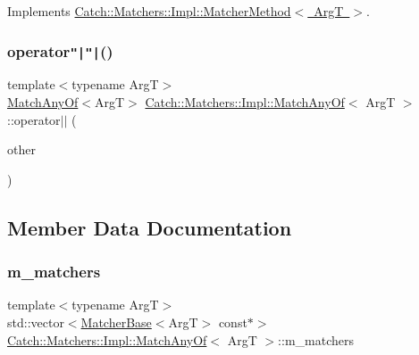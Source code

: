 Implements \mbox{\hyperlink{struct_catch_1_1_matchers_1_1_impl_1_1_matcher_method_ae0920ff9e817acf08e1bb0cbcb044e30}{Catch\+::\+Matchers\+::\+Impl\+::\+Matcher\+Method$<$ Arg\+T $>$}}.

\mbox{\label{struct_catch_1_1_matchers_1_1_impl_1_1_match_any_of_ab356d77b28b487c2d9fe8b1e1e6f78c9}} 
\subsubsection{\texorpdfstring{operator\texttt{"|}\texttt{"|}()}{operator||()}}
{\footnotesize\ttfamily template$<$typename ArgT$>$ \\
\mbox{\hyperlink{struct_catch_1_1_matchers_1_1_impl_1_1_match_any_of}{Match\+Any\+Of}}$<$ArgT$>$ \mbox{\hyperlink{struct_catch_1_1_matchers_1_1_impl_1_1_match_any_of}{Catch\+::\+Matchers\+::\+Impl\+::\+Match\+Any\+Of}}$<$ ArgT $>$\+::operator$\vert$$\vert$ (\begin{DoxyParamCaption}\item[{\mbox{\hyperlink{struct_catch_1_1_matchers_1_1_impl_1_1_matcher_base}{Matcher\+Base}}$<$ ArgT $>$ const \&}]{other }\end{DoxyParamCaption})\hspace{0.3cm}{\ttfamily [inline]}}



\subsection{Member Data Documentation}
\mbox{\label{struct_catch_1_1_matchers_1_1_impl_1_1_match_any_of_a1fb1119e6110dc15b8d5262ec0aeddd5}} 
\subsubsection{\texorpdfstring{m\+\_\+matchers}{m\_matchers}}
{\footnotesize\ttfamily template$<$typename ArgT$>$ \\
std\+::vector$<$\mbox{\hyperlink{struct_catch_1_1_matchers_1_1_impl_1_1_matcher_base}{Matcher\+Base}}$<$ArgT$>$ const$\ast$$>$ \mbox{\hyperlink{struct_catch_1_1_matchers_1_1_impl_1_1_match_any_of}{Catch\+::\+Matchers\+::\+Impl\+::\+Match\+Any\+Of}}$<$ ArgT $>$\+::m\+\_\+matchers}




